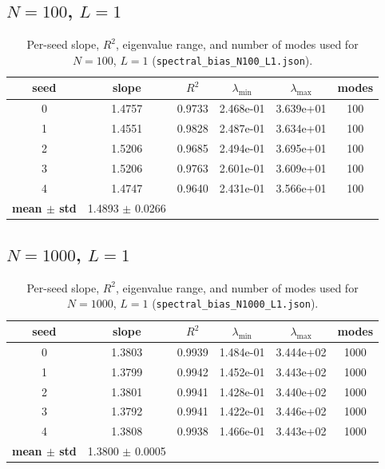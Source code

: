 \subsection{$N=100$, $L=1$}
\begin{table}[H]
\centering
\caption{Per-seed slope, $R^2$, eigenvalue range, and number of modes used for $N=100$, $L=1$ (\texttt{spectral\_bias\_N100\_L1.json}).}
\label{tab:slopeA-N100-L1}
\begin{tabular}{c c c c c c}
\toprule
seed & slope & $R^2$ & $\lambda_{\min}$ & $\lambda_{\max}$ & modes \\
\midrule
0 & 1.4757 & 0.9733 & 2.468e-01 & 3.639e+01 & 100 \\
1 & 1.4551 & 0.9828 & 2.487e-01 & 3.634e+01 & 100 \\
2 & 1.5206 & 0.9685 & 2.494e-01 & 3.695e+01 & 100 \\
3 & 1.5206 & 0.9763 & 2.601e-01 & 3.609e+01 & 100 \\
4 & 1.4747 & 0.9640 & 2.431e-01 & 3.566e+01 & 100 \\
\midrule
\textbf{mean $\pm$ std} & 1.4893 $\pm$ 0.0266 & \multicolumn{4}{l}{} \\
\bottomrule
\end{tabular}
\end{table}

\subsection{$N=1000$, $L=1$}
\begin{table}[H]
\centering
\caption{Per-seed slope, $R^2$, eigenvalue range, and number of modes used for $N=1000$, $L=1$ (\texttt{spectral\_bias\_N1000\_L1.json}).}
\label{tab:slopeA-N1000-L1}
\begin{tabular}{c c c c c c}
\toprule
seed & slope & $R^2$ & $\lambda_{\min}$ & $\lambda_{\max}$ & modes \\
\midrule
0 & 1.3803 & 0.9939 & 1.484e-01 & 3.444e+02 & 1000 \\
1 & 1.3799 & 0.9942 & 1.452e-01 & 3.443e+02 & 1000 \\
2 & 1.3801 & 0.9941 & 1.428e-01 & 3.440e+02 & 1000 \\
3 & 1.3792 & 0.9941 & 1.422e-01 & 3.446e+02 & 1000 \\
4 & 1.3808 & 0.9938 & 1.466e-01 & 3.443e+02 & 1000 \\
\midrule
\textbf{mean $\pm$ std} & 1.3800 $\pm$ 0.0005 & \multicolumn{4}{l}{} \\
\bottomrule
\end{tabular}
\end{table}

